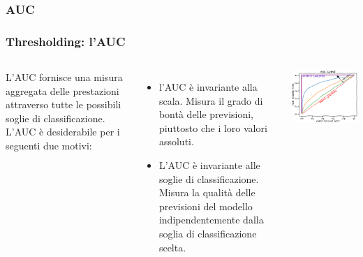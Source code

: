 \subsubsection[AUC]{AUC}
\begin{frame}
	\frametitle{Thresholding: l'AUC}
	
	\begin{columns}
		L'AUC fornisce una misura aggregata delle prestazioni attraverso tutte le possibili soglie di classificazione.
		\newlinedouble
		L'AUC è desiderabile per i seguenti due motivi:
		\begin{itemize}
			\item l'AUC è invariante alla scala. Misura il grado di bontà delle previsioni, piuttosto che i loro valori assoluti.
			\item L'AUC è invariante alle soglie di classificazione. Misura la qualità delle previsioni del modello indipendentemente dalla soglia di classificazione scelta.
		\end{itemize}
			
		\begin{center}
			\includegraphics[width=1.0\linewidth]{images/supervised/z_algoritms_logistic_thresholding/roc-curve.png}
		\end{center}			
	\end{columns}
	
\end{frame}

